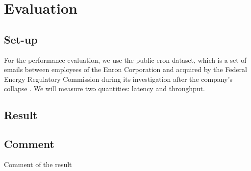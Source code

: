 \documentclass[sigconf]{acmart}
\begin{document}
\section{Evaluation}

\subsection{Set-up}

For the performance evaluation, we use the public eron dataset, which is a set of emails between employees of the Enron Corporation and acquired by the Federal Energy Regulatory Commission during its investigation after the company's collapse \cite{enron}. We will measure two quantities: latency and throughput.

\subsection{Result}

\subsection{Comment}
Comment of the result



\end{document}

